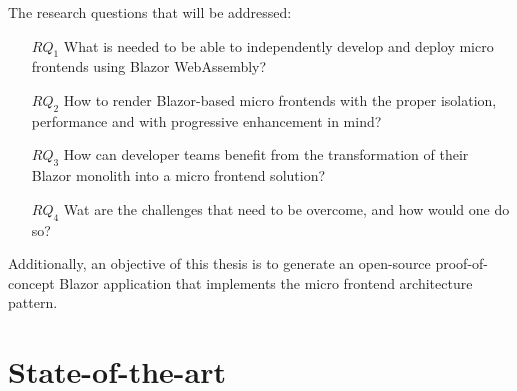 \begin{minipage}{\linewidth} %
     The research questions that will be addressed:
    \begin{itemize}
        \item[$RQ_1$] What is needed to be able to independently develop and deploy micro
        frontends using Blazor WebAssembly?
        \item[$RQ_2$] How to render Blazor-based micro frontends with the proper isolation,
        performance and with progressive enhancement in mind?
        \item[$RQ_3$] How can developer teams benefit from the transformation of their
        Blazor monolith into a micro frontend solution?
        \item[$RQ_4$] Wat are the challenges that need to be overcome, and how would one do
        so? 
    \end{itemize}
\end{minipage}

\blankline
Additionally, an objective of this thesis is to generate an open-source
proof-of-concept Blazor application that implements the micro frontend
architecture pattern.

\section{State-of-the-art}
\label{sec:state-of-the-art}

%
%

